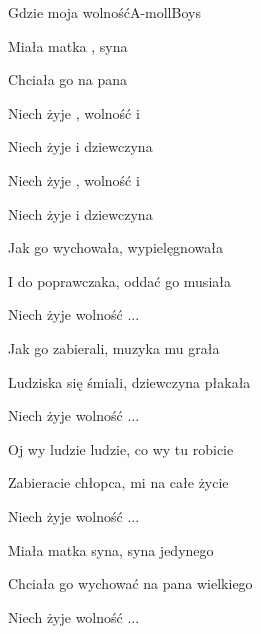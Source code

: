 \begin{song}{Gdzie moja wolność}{A-moll}{}{Boys}{}{}
  \begin{SBVerse}
    Miała matka , syna 

    Chciała go  na pana 
  \end{SBVerse}
  \begin{SBChorus}
    Niech żyje , wolność i 

    Niech żyje  i dziewczyna  

    Niech żyje , wolność i 

    Niech żyje  i dziewczyna 
  \end{SBChorus}
  \begin{SBVerse}
    Jak go wychowała, wypielęgnowała

    I do poprawczaka, oddać go musiała
  \end{SBVerse}
  \begin{SBChorus}
    Niech żyje wolność ...
  \end{SBChorus}
  \begin{SBVerse}
    Jak go zabierali, muzyka mu grała

    Ludziska się śmiali, dziewczyna płakała
  \end{SBVerse}
  \begin{SBChorus}
    Niech żyje wolność ...
  \end{SBChorus}
  \begin{SBVerse}
    Oj wy ludzie ludzie, co wy tu robicie

    Zabieracie chłopca, mi na całe życie
  \end{SBVerse}
  \begin{SBChorus}
    Niech żyje wolność ...
  \end{SBChorus}
  \begin{SBVerse}
    Miała matka syna, syna jedynego

    Chciała go wychować na pana wielkiego
  \end{SBVerse}
  \begin{SBChorus}
    Niech żyje wolność ...
  \end{SBChorus}
\end{song}
